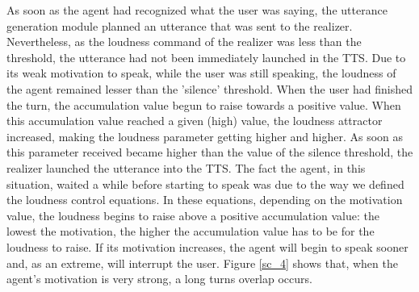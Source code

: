 
As soon as the agent had recognized what the user was saying, the utterance generation module planned an utterance that was sent to the realizer. Nevertheless, as the loudness command of the realizer was less than the threshold, the utterance had  not been immediately launched in the TTS. 
Due to its weak motivation to speak, while the user was still speaking, the loudness of the agent remained lesser than the 'silence' threshold. When the user had finished the turn, the accumulation value begun to raise towards a positive value. When this accumulation value reached a given (high) value, the loudness attractor increased, making the loudness parameter getting higher and higher. As soon as this parameter received became higher than the value of the silence threshold, the realizer launched the utterance into the TTS.
The fact the agent, in this situation, waited a while before starting to speak was due to the way we defined the loudness control equations. In these equations, depending on the motivation value, the loudness begins to raise above a positive accumulation value: the lowest the motivation, the higher the accumulation value has to be for the loudness to raise. If its motivation increases, the agent will begin to speak sooner and, as an extreme, will interrupt the user. Figure \ref{sc_4} shows that, when the agent's motivation is very strong, a long turns overlap occurs. 

